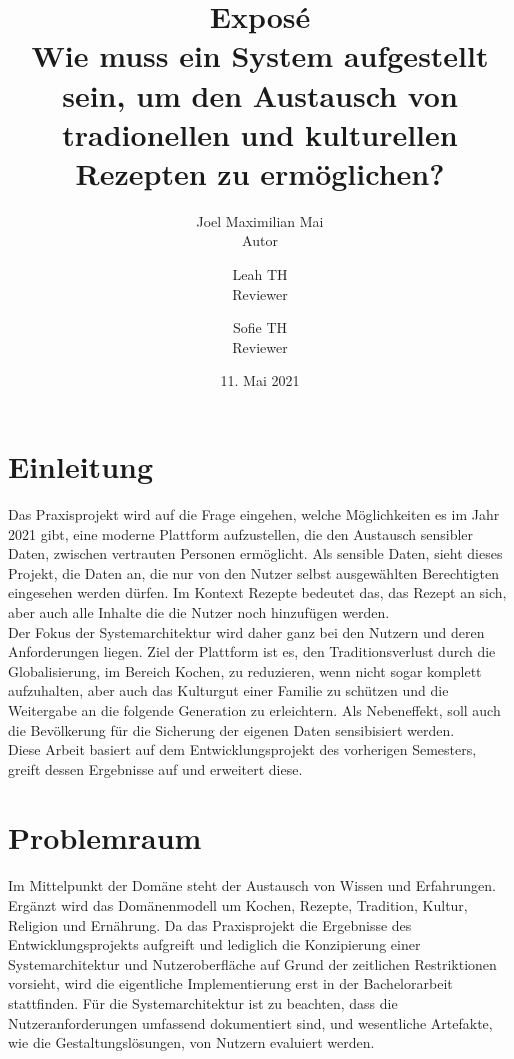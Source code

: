 \documentclass[10pt]{article}
\author{Joel Maximilian Mai\\Autor \and Leah TH\\Reviewer \and Sofie TH\\Reviewer}
\title{Exposé\\ Wie muss ein System aufgestellt sein, um den Austausch von tradionellen und kulturellen Rezepten zu ermöglichen?}
\date{11. Mai 2021}
\begin{document}
    \maketitle 

    \newpage

    \section{Einleitung}\label{sec:Einleitung}
    Das Praxisprojekt wird auf die Frage eingehen, welche Möglichkeiten es im Jahr 2021 gibt, eine moderne Plattform aufzustellen, die den Austausch sensibler Daten, zwischen vertrauten Personen ermöglicht. Als sensible Daten, sieht dieses Projekt, die Daten an, die nur von den Nutzer selbst ausgewählten Berechtigten eingesehen werden dürfen. Im Kontext Rezepte bedeutet das, das Rezept an sich, aber auch alle Inhalte die die Nutzer noch hinzufügen werden. \\
    Der Fokus der Systemarchitektur wird daher ganz bei den Nutzern und deren Anforderungen liegen. Ziel der Plattform ist es, den Traditionsverlust durch die Globalisierung\cite{bpb2021fastfood}\cite{bpb2021fastfoodtopic}, im Bereich Kochen, zu reduzieren, wenn nicht sogar komplett aufzuhalten, aber auch das Kulturgut einer Familie\cite[Kapitel 2.4]{karena2021} zu schützen und die Weitergabe an die folgende Generation zu erleichtern. Als Nebeneffekt, soll auch die Bevölkerung für die Sicherung der eigenen Daten sensibisiert werden.\\ 
    Diese Arbeit basiert auf dem Entwicklungsprojekt\cite{cobanmai2021} des vorherigen Semesters, greift dessen Ergebnisse auf und erweitert diese.

    \section{Problemraum}\label{sec:Problemraum}
    Im Mittelpunkt der Domäne steht der Austausch von Wissen und Erfahrungen. Ergänzt wird das Domänenmodell um Kochen, Rezepte, Tradition, Kultur, Religion und Ernährung. Da das Praxisprojekt die Ergebnisse des Entwicklungsprojekts aufgreift und lediglich die Konzipierung einer Systemarchitektur und Nutzeroberfläche auf Grund der zeitlichen Restriktionen vorsieht, wird die eigentliche Implementierung erst in der Bachelorarbeit stattfinden. Für die Systemarchitektur ist zu beachten, dass die Nutzeranforderungen umfassend dokumentiert sind, und wesentliche Artefakte, wie die Gestaltungslösungen, von Nutzern evaluiert werden.
\end{document}
